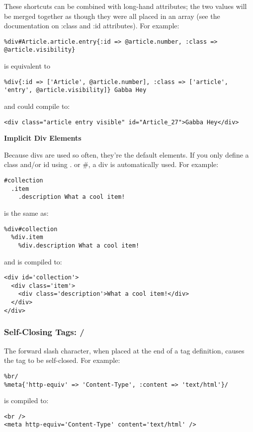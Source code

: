 \documentclass[10pt]{article}
\begin{document}
 These shortcuts can be combined with long-hand attributes; the two values will be merged together as though they were all placed in an array (see the documentation on :class and :id attributes). For example:
\begin{verbatim}
%div#Article.article.entry{:id => @article.number, :class => @article.visibility}
\end{verbatim}


 is equivalent to
\begin{verbatim}
%div{:id => ['Article', @article.number], :class => ['article', 'entry', @article.visibility]} Gabba Hey
\end{verbatim}


 and could compile to:
\begin{verbatim}
<div class="article entry visible" id="Article_27">Gabba Hey</div>
\end{verbatim}
\textbf{Implicit Div Elements}


 Because divs are used so often, they’re the default elements. If you only define a class and/or id using . or \#, a div is automatically used. For example:
\begin{verbatim}
#collection
  .item
    .description What a cool item!
\end{verbatim}


 is the same as:
\begin{verbatim}
%div#collection
  %div.item
    %div.description What a cool item!
\end{verbatim}


 and is compiled to:
\begin{verbatim}
<div id='collection'>
  <div class='item'>
    <div class='description'>What a cool item!</div>
  </div>
</div>
\end{verbatim}
\subsubsection*{Self-Closing Tags: /}


 The forward slash character, when placed at the end of a tag definition, causes the tag to be self-closed. For example:
\begin{verbatim}
%br/
%meta{'http-equiv' => 'Content-Type', :content => 'text/html'}/
\end{verbatim}


 is compiled to:
\begin{verbatim}
<br />
<meta http-equiv='Content-Type' content='text/html' />
\end{verbatim}
\end{document}
